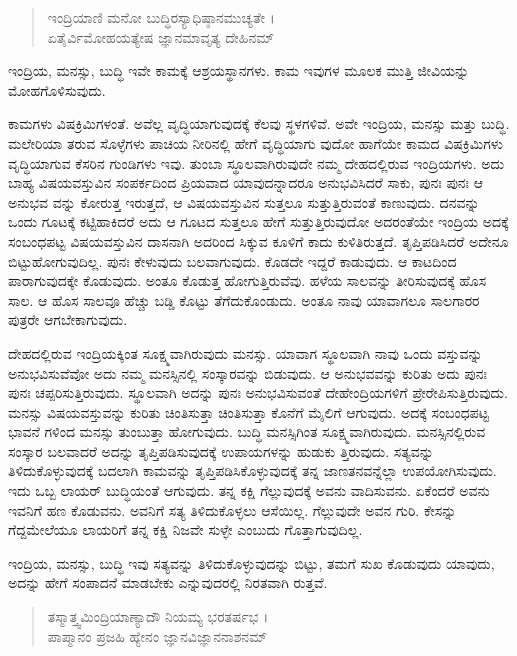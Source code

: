 \begin{verse}
ಇಂದ್ರಿಯಾಣಿ ಮನೋ ಬುದ್ಧಿರಸ್ಯಾಧಿಷ್ಠಾನಮುಚ್ಯತೇ ।\\ಏತೈರ್ವಿಮೋಹಯತ್ಯೇಷ ಜ್ಞಾನಮಾವೃತ್ಯ ದೇಹಿನಮ್ 
\end{verse}

{\small ಇಂದ್ರಿಯ, ಮನಸ್ಸು, ಬುದ್ಧಿ ಇವೇ ಕಾಮಕ್ಕೆ ಆಶ್ರಯಸ್ಥಾನಗಳು. ಕಾಮ ಇವುಗಳ ಮೂಲಕ ಮುತ್ತಿ ಜೀವಿಯನ್ನು ಮೋಹಗೊಳಿಸುವುದು.}

ಕಾಮಗಳು ವಿಷಕ್ರಿಮಿಗಳಂತೆ. ಅವೆಲ್ಲ ವೃದ್ಧಿಯಾಗುವುದಕ್ಕೆ ಕೆಲವು ಸ್ಥಳಗಳಿವೆ. ಅವೇ ಇಂದ್ರಿಯ, ಮನಸ್ಸು ಮತ್ತು ಬುದ್ಧಿ. ಮಲೇರಿಯಾ ತರುವ ಸೊಳ್ಳೆಗಳು ಪಾಚಿಯ ನೀರಿನಲ್ಲಿ ಹೇಗೆ ವೃದ್ಧಿಯಾಗು ವುದೋ ಹಾಗೆಯೇ ಕಾಮದ ವಿಷಕ್ರಿಮಿಗಳು ವೃದ್ಧಿಯಾಗುವ ಕೆಸರಿನ ಗುಂಡಿಗಳು ಇವು. ತುಂಬಾ ಸ್ಥೂಲವಾಗಿರುವುದೇ ನಮ್ಮ ದೇಹದಲ್ಲಿರುವ ಇಂದ್ರಿಯಗಳು. ಅದು ಬಾಹ್ಯ ವಿಷಯವಸ್ತುವಿನ ಸಂಪರ್ಕದಿಂದ ಪ್ರಿಯವಾದ ಯಾವುದನ್ನಾದರೂ ಅನುಭವಿಸಿದರೆ ಸಾಕು, ಪುನಃ ಪುನಃ ಆ ಅನುಭವ ವನ್ನು ಕೋರುತ್ತ ಇರುತ್ತದೆ, ಆ ವಿಷಯವಸ್ತುವಿನ ಸುತ್ತಲೂ ಸುತ್ತುತ್ತಿರುವಂತೆ ಕಾಣುವುದು. ದನವನ್ನು ಒಂದು ಗೂಟಕ್ಕೆ ಕಟ್ಟಿಹಾಕಿದರೆ ಅದು ಆ ಗೂಟದ ಸುತ್ತಲೂ ಹೇಗೆ ಸುತ್ತುತ್ತಿರುವುದೋ ಅದರಂತೆಯೇ ಇಂದ್ರಿಯ ಅದಕ್ಕೆ ಸಂಬಂಧಪಟ್ಟ ವಿಷಯವಸ್ತುವಿನ ದಾಸನಾಗಿ ಅದರಿಂದ ಸಿಕ್ಕುವ ಕೂಳಿಗೆ ಕಾದು ಕುಳಿತಿರುತ್ತದೆ. ತೃಪ್ತಿಪಡಿಸಿದರೆ ಅದೇನೂ ಬಿಟ್ಟುಹೋಗುವುದಿಲ್ಲ. ಪುನಃ ಕೇಳುವುದು ಬಲವಾಗುವುದು. ಕೊಡದೇ ಇದ್ದರೆ ಕಾಡುವುದು. ಆ ಕಾಟದಿಂದ ಪಾರಾಗುವುದಕ್ಕೇ ಕೊಡುವುದು. ಅಂತೂ ಕೊಡುತ್ತ ಹೋಗುತ್ತಿರುವೆವು. ಹಳೆಯ ಸಾಲವನ್ನು ತೀರಿಸುವುದಕ್ಕೆ ಹೊಸ ಸಾಲ. ಆ ಹೊಸ ಸಾಲವೂ ಹೆಚ್ಚು ಬಡ್ಡಿ ಕೊಟ್ಟು ತೆಗೆದುಕೊಂಡುದು. ಅಂತೂ ನಾವು ಯಾವಾಗಲೂ ಸಾಲಗಾರರ ಪುತ್ರರೇ ಆಗಬೇಕಾಗುವುದು.

ದೇಹದಲ್ಲಿರುವ ಇಂದ್ರಿಯಕ್ಕಿಂತ ಸೂಕ್ಷ್ಮವಾಗಿರುವುದು ಮನಸ್ಸು. ಯಾವಾಗ ಸ್ಥೂಲವಾಗಿ ನಾವು ಒಂದು ವಸ್ತುವನ್ನು ಅನುಭವಿಸುವೆವೋ ಅದು ನಮ್ಮ ಮನಸ್ಸಿನಲ್ಲಿ ಸಂಸ್ಕಾರವನ್ನು ಬಿಡುವುದು. ಆ ಅನುಭವವನ್ನು ಕುರಿತು ಅದು ಪುನಃ ಪುನಃ ಚಪ್ಪರಿಸುತ್ತಿರುವುದು. ಸ್ಥೂಲವಾಗಿ ಅದನ್ನು ಪುನಃ ಅನುಭವಿಸುವಂತೆ ದೇಹೇಂದ್ರಿಯಗಳಿಗೆ ಪ್ರೇರೇಪಿಸುತ್ತಿರುವುದು. ಮನಸ್ಸು ವಿಷಯವಸ್ತುವನ್ನು ಕುರಿತು ಚಿಂತಿಸುತ್ತಾ ಚಿಂತಿಸುತ್ತಾ ಕೊನೆಗೆ ಮೈಲಿಗೆ ಆಗುವುದು. ಅದಕ್ಕೆ ಸಂಬಂಧಪಟ್ಟ ಭಾವನೆ ಗಳಿಂದ ಮನಸ್ಸು ತುಂಬುತ್ತಾ ಹೋಗುವುದು. ಬುದ್ಧಿ ಮನಸ್ಸಿಗಿಂತ ಸೂಕ್ಷ್ಮವಾಗಿರುವುದು. ಮನಸ್ಸಿನಲ್ಲಿರುವ ಸಂಸ್ಕಾರ ಬಲವಾದರೆ ಅದನ್ನು ತೃಪ್ತಿಪಡಿಸುವುದಕ್ಕೆ ಉಪಾಯಗಳನ್ನು ಹುಡುಕು ತ್ತಿರುವುದು. ಸತ್ಯವನ್ನು ತಿಳಿದುಕೊಳ್ಳುವುದಕ್ಕೆ ಬದಲಾಗಿ ಕಾಮವನ್ನು ತೃಪ್ತಿಪಡಿಸಿಕೊಳ್ಳುವುದಕ್ಕೆ ತನ್ನ ಜಾಣತನವನ್ನೆಲ್ಲಾ ಉಪಯೋಗಿಸುವುದು. ಇದು ಒಬ್ಬ ಲಾಯರ್ ಬುದ್ಧಿಯಂತೆ ಆಗುವುದು. ತನ್ನ ಕಕ್ಷಿ ಗೆಲ್ಲುವುದಕ್ಕೆ ಅವನು ವಾದಿಸುವನು. ಏಕೆಂದರೆ ಅವನು ಇವನಿಗೆ ಹಣ ಕೊಡುವನು. ಅವನಿಗೆ ಸತ್ಯ ತಿಳಿದುಕೊಳ್ಳಲು ಆಸೆಯಿಲ್ಲ. ಗೆಲ್ಲುವುದೇ ಅವನ ಗುರಿ. ಕೇಸನ್ನು ಗೆದ್ದಮೇಲೆಯೂ ಲಾಯರಿಗೆ ತನ್ನ ಕಕ್ಷಿ ನಿಜವೇ ಸುಳ್ಳೇ ಎಂಬುದು ಗೊತ್ತಾಗುವುದಿಲ್ಲ.

ಇಂದ್ರಿಯ, ಮನಸ್ಸು, ಬುದ್ಧಿ ಇವು ಸತ್ಯವನ್ನು ತಿಳಿದುಕೊಳ್ಳುವುದನ್ನು ಬಿಟ್ಟು, ತಮಗೆ ಸುಖ ಕೊಡುವುದು ಯಾವುದು, ಅದನ್ನು ಹೇಗೆ ಸಂಪಾದನೆ ಮಾಡಬೇಕು ಎನ್ನುವುದರಲ್ಲಿ ನಿರತವಾಗಿ ರುತ್ತವೆ.

\begin{verse}
ತಸ್ಮಾತ್ತ್ವಮಿಂದ್ರಿಯಾಣ್ಯಾದೌ ನಿಯಮ್ಯ ಭರತರ್ಷಭ ।\\ಪಾಪ್ಮಾನಂ ಪ್ರಜಹಿ ಹ್ಯೇನಂ ಜ್ಞಾನವಿಜ್ಞಾನನಾಶನಮ್ 
\end{verse}

